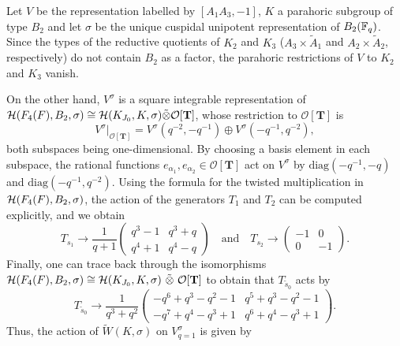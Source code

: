 \begin{example}\label{ex:A1A3}
    Let $V$ be the representation labelled by $[A_1A_3,-1]$, $K$ a parahoric subgroup of type $B_2$ and let $\sigma$ be the unique cuspidal unipotent representation of $B_2(\mathbb{F}_q)$. Since the types of the reductive quotients of $K_2$ and $K_3$ ($A_3\times\tilde{A}_1$ and $A_2\times\tilde{A}_2$, respectively) do not contain $B_2$ as a factor, the parahoric restrictions of $V$ to $K_2$ and $K_3$ vanish. 

    On the other hand, $V^\sigma$ is a square integrable representation of $\mathcal{H}(F_4(F),B_2,\sigma)\cong\mathcal{H}(K_{J_0},K,\sigma)\tilde\otimes\mathcal{O}[\mathbf{T}]$, whose restriction to $\mathcal{O}[\mathbf{T}]$ is
    $$V^\sigma|_{\mathcal{O}[\mathbf{T}]}=V^\sigma(q^{-2},-q^{-1})\oplus V^\sigma(-q^{-1},q^{-2}),$$
    both subspaces being one-dimensional. By choosing a basis element in each subspace, the rational functions $e_{\alpha_1}, e_{\alpha_2}\in\mathcal{O}[\mathbf{T}]$ act on $V^\sigma$ by $\mathrm{diag}(-q^{-1},-q)$ and $\mathrm{diag}(-q^{-1},q^{-2})$. Using the formula for the twisted multiplication in $\mathcal{H}(F_4(F),B_2,\sigma)$, the action of the generators $T_1$ and $T_2$ can be computed explicitly, and we obtain
    \begin{equation*}
        T_{s_1}\longrightarrow\frac{1}{q+1}\begin{pmatrix}
            q^3-1 & q^3+q \\
            q^4+1 & q^4-q
        \end{pmatrix}\quad\text{and}\quad T_{s_2}\longrightarrow\begin{pmatrix}
            -1 & 0 \\
            0 & -1
        \end{pmatrix}.
    \end{equation*}
    Finally, one can trace back through the isomorphisms $\cH(F_4(F),B_2,\sigma)\cong\cH(K_{J_0},K,\sigma)\ \tilde\otimes\ \mathcal{O}[\mathbf{T}]$ to obtain that $T_{\tilde{s}_0}$ acts by
    \begin{equation*}
        T_{\tilde{s}_0}\longrightarrow\frac{1}{q^3+q^2}\begin{pmatrix}
            -q^6+q^3-q^2-1 & q^5+q^3-q^2-1 \\
            -q^7+q^4-q^3+1 & q^6+q^4-q^3+1
        \end{pmatrix}.
    \end{equation*}
    Thus, the action of $\tilde{W}(K,\sigma)$ on $V^\sigma_{q=1}$ is given by
    \begin{equation*}

\end{equation*}
\end{example}
